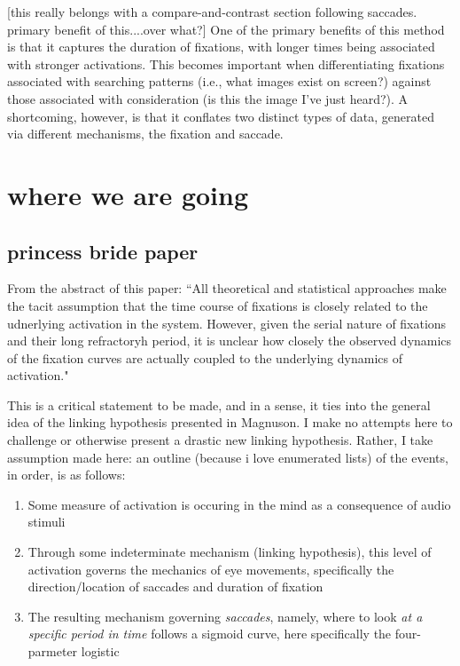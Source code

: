 \documentclass{article}
\begin{document}
[this really belongs with a compare-and-contrast section following saccades. primary benefit of this....over what?] One of the primary benefits of this method is that it captures the duration of fixations, with longer times being associated with stronger activations. This becomes important when differentiating fixations associated with searching patterns (i.e., what images exist on screen?) against those associated with consideration (is this the image I've just heard?). A shortcoming, however, is that it conflates two distinct types of data, generated via different mechanisms, the fixation and saccade. 

\section{where we are going}

\subsection{princess bride paper}

From the abstract of this paper: ``All theoretical and statistical approaches make the tacit assumption that the time course of fixations is closely related to the udnerlying activation in the system. However, given the serial nature of fixations and their long refractoryh period, it is unclear how closely the observed dynamics of the fixation curves are actually coupled to the underlying dynamics of activation."

This is a critical statement to be made, and in a sense, it ties into the general idea of the linking hypothesis presented in Magnuson. I make no attempts here to challenge or otherwise present a drastic new linking hypothesis. Rather, I take assumption made here: an outline (because i love enumerated lists) of the events, in order, is as follows:

\begin{singlespace}
\begin{enumerate}
\item Some measure of activation is occuring in the mind as a consequence of audio stimuli
\item Through some indeterminate mechanism (linking hypothesis), this level of activation governs the mechanics of eye movements, specifically the direction/location of saccades and duration of fixation
\item The resulting mechanism governing \textit{saccades}, namely, where to look \textit{at a specific period in time} follows a sigmoid curve, here specifically the four-parmeter logistic
\end{enumerate}
\end{singlespace}
\end{document}
